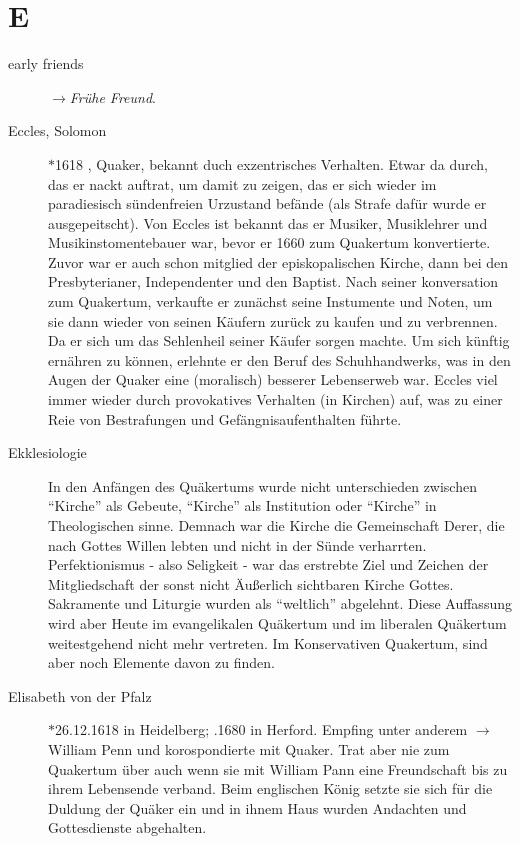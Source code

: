 \section*{E}

\articlesize

\begin{description}

 \item[early friends] $\to$\textit{Frühe Freund}.

 \item[Eccles, Solomon] $\ast$1618 , Quaker,  bekannt duch exzentrisches
 Verhalten. Etwar da durch, das er nackt auftrat, um damit zu zeigen, das er
 sich wieder im paradiesisch sündenfreien Urzustand befände (als Strafe dafür
 wurde er ausgepeitscht). Von Eccles ist bekannt das er Musiker, Musiklehrer und
 Musikinstomentebauer war, bevor er 1660 zum Quakertum konvertierte. Zuvor
 war er auch schon mitglied der episkopalischen Kirche, dann bei den
 Presbyterianer, Independenter und den Baptist. Nach seiner konversation zum
 Quakertum, verkaufte er zunächst seine Instumente und Noten, um sie dann wieder
 von seinen Käufern zurück zu kaufen und zu verbrennen. Da er sich um das
 Sehlenheil seiner Käufer sorgen machte. Um sich künftig ernähren zu können,
 erlehnte er den Beruf des Schuhhandwerks, was in den Augen der Quaker eine
 (moralisch) besserer Lebenserweb war. Eccles viel immer wieder durch
 provokatives Verhalten (in Kirchen) auf, was zu einer Reie von Bestrafungen und
 Gefängnisaufenthalten führte.

 \item[Ekklesiologie] In den Anfängen des Quäkertums wurde nicht unterschieden zwischen "`Kirche"' als Gebeute, "`Kirche"' als Institution oder "`Kirche"' in Theologischen sinne. Demnach war die Kirche die Gemeinschaft Derer, die nach Gottes Willen lebten und nicht in der Sünde verharrten. Perfektionismus - also Seligkeit - war das erstrebte Ziel und Zeichen der Mitgliedschaft der sonst nicht Äußerlich sichtbaren Kirche Gottes. Sakramente und Liturgie wurden als "`weltlich"' abgelehnt. Diese Auffassung wird aber Heute im evangelikalen Quäkertum und im liberalen Quäkertum weitestgehend nicht mehr vertreten. Im Konservativen Quakertum, sind aber noch Elemente davon zu finden.


 \item[Elisabeth von der Pfalz] $\ast$26.12.1618 in Heidelberg; .1680
 in Herford. Empfing unter anderem $\to$William Penn und korospondierte mit
 Quaker. Trat aber nie zum Quakertum über auch wenn sie mit William Pann eine
 Freundschaft bis zu ihrem Lebensende verband. Beim englischen König setzte sie
 sich für die Duldung der Quäker ein und in ihnem Haus wurden Andachten und
 Gottesdienste abgehalten.


\end{description}
